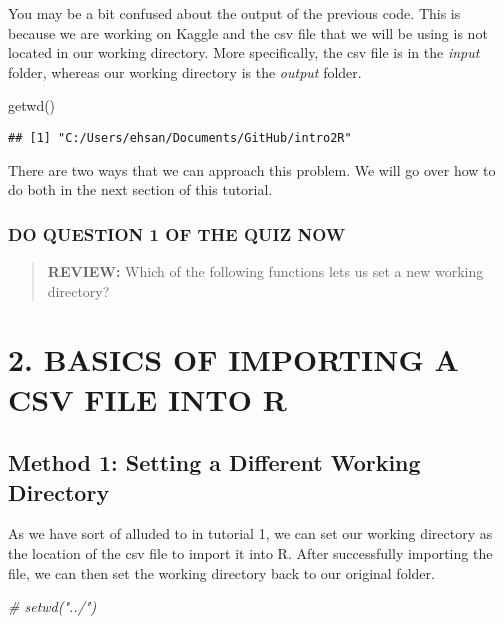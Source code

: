 \documentclass[
]{book}
\newenvironment{Shaded}{\begin{snugshade}}{\end{snugshade}}
\newcommand{\CommentTok}[1]{\textcolor[rgb]{0.56,0.35,0.01}{\textit{#1}}}
\newcommand{\FunctionTok}[1]{\textcolor[rgb]{0.00,0.00,0.00}{#1}}
\newcommand{\NormalTok}[1]{#1}
\begin{document}
You may be a bit confused about the output of the previous code. This is because we are working on Kaggle and the csv file that we will be using is not located in our working directory. More specifically, the csv file is in the \emph{input} folder, whereas our working directory is the \emph{output} folder.

\begin{Shaded}
\begin{Highlighting}[]
\FunctionTok{getwd}\NormalTok{()}
\end{Highlighting}
\end{Shaded}

\begin{verbatim}
## [1] "C:/Users/ehsan/Documents/GitHub/intro2R"
\end{verbatim}

There are two ways that we can approach this problem. We will go over how to do both in the next section of this tutorial.

\hypertarget{do-question-1-of-the-quiz-now}{%
\subsubsection{DO QUESTION 1 OF THE QUIZ NOW}\label{do-question-1-of-the-quiz-now}}

\begin{quote}
\textbf{REVIEW:} Which of the following functions lets us set a new working directory?
\end{quote}

\hypertarget{basics-of-importing-a-csv-file-into-r}{%
\section{2. BASICS OF IMPORTING A CSV FILE INTO R}\label{basics-of-importing-a-csv-file-into-r}}

\hypertarget{method-1-setting-a-different-working-directory}{%
\subsection{Method 1: Setting a Different Working Directory}\label{method-1-setting-a-different-working-directory}}

As we have sort of alluded to in tutorial 1, we can set our working directory as the location of the csv file to import it into R. After successfully importing the file, we can then set the working directory back to our original folder.

\begin{Shaded}
\begin{Highlighting}[]
\CommentTok{\# setwd("../")}
\end{Highlighting}
\end{Shaded}
\end{document}

